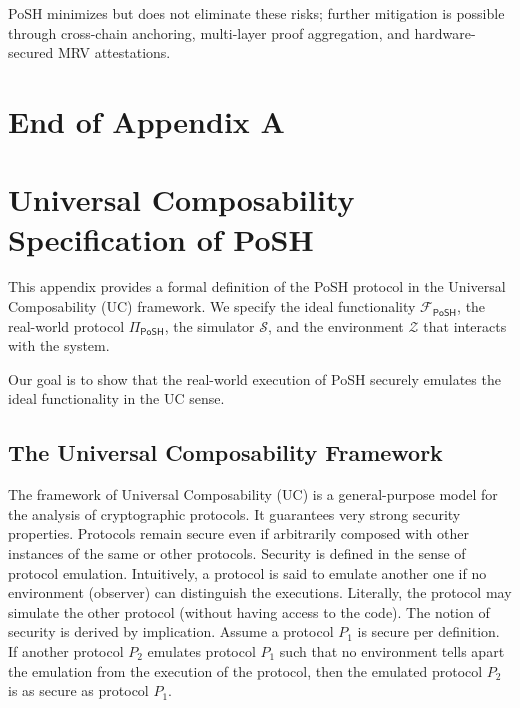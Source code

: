 \documentclass[11pt,a4paper]{report}
\theoremstyle{definition}
\theoremstyle{remark}
\begin{document}
PoSH minimizes but does not eliminate these risks; further mitigation is
possible through cross-chain anchoring, multi-layer proof aggregation, and
hardware-secured MRV attestations.

\chapter*{End of Appendix A}

\chapter{Universal Composability Specification of PoSH}
\label{appendix:uc-model}

This appendix provides a formal definition of the PoSH protocol in the Universal
Composability (UC) framework. We specify the ideal functionality
$\mathcal{F}_{\textsf{PoSH}}$, the real-world protocol $\Pi_{\textsf{PoSH}}$,
the simulator $\mathcal{S}$, and the environment $\mathcal{Z}$ that interacts
with the system.

Our goal is to show that the real-world execution of PoSH securely emulates the
ideal functionality in the UC sense.

\section{The Universal Composability Framework}

The framework of Universal Composability (UC) \cite{Canetti01} is a general-purpose model for the
analysis of cryptographic protocols. It guarantees very strong security
properties. Protocols remain secure even if arbitrarily composed with other
instances of the same or other protocols. Security is defined in the sense of
protocol emulation. Intuitively, a protocol is said to emulate another one if no
environment (observer) can distinguish the executions. Literally, the protocol
may simulate the other protocol (without having access to the code). The notion
of security is derived by implication. Assume a protocol $P_1$ is secure per
definition. If another protocol $P_2$ emulates protocol $P_1$ such that no
environment tells apart the emulation from the execution of the protocol, then
the emulated protocol $P_2$ is as secure as protocol $P_1$.
\end{document}
